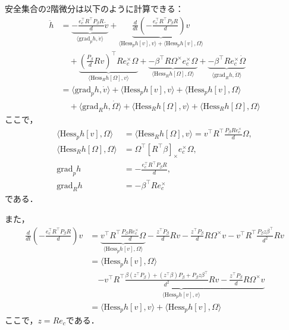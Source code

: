 安全集合の2階微分は以下のように計算できる：
\begin{equation}
\begin{aligned}
\ddot{h} &= \underbrace{-\frac{e_c^\top R^\top P_\beta R}{d} \dot{v}}_{\langle \mathrm{grad}_p h, \dot{v} \rangle} + \underbrace{\frac{d}{dt}\left(-\frac{e_c^\top R^\top P_\beta R}{d}\right) v}_{\langle \mathrm{Hess}_p h[v], v \rangle + \langle \mathrm{Hess}_p h[v], \Omega \rangle} \\
&\quad + \underbrace{\left(\frac{P_\beta}{d} R v\right)^\top R e_c^\times \Omega}_{\langle \mathrm{Hess}_R h[\Omega], v \rangle} + \underbrace{-\beta^\top R \Omega^\times e_c^\times \Omega}_{\langle \mathrm{Hess}_R h[\Omega], \Omega \rangle} + \underbrace{-\beta^\top R e_c^\times \dot{\Omega}}_{\langle \mathrm{grad}_R h, \dot{\Omega} \rangle} \\
&= \langle \mathrm{grad}_p h, \dot{v} \rangle + \langle \mathrm{Hess}_p h[v], v \rangle + \langle \mathrm{Hess}_p h[v], \Omega \rangle \\
&\quad + \langle \mathrm{grad}_R h, \dot{\Omega} \rangle + \langle \mathrm{Hess}_R h[\Omega], v \rangle + \langle \mathrm{Hess}_R h[\Omega], \Omega \rangle
\label{eq:single_hocbf_derivative}
\end{aligned}
\end{equation}
ここで，
\begin{equation}
\begin{aligned}
\langle \mathrm{Hess}_p h[v], \Omega \rangle &= \langle \mathrm{Hess}_R h[\Omega], v \rangle = v^\top R^\top \frac{P_\beta R e_c^\times}{d} \Omega, \\
\langle \mathrm{Hess}_R h[\Omega], \Omega \rangle &= \Omega^\top [R^\top \beta]_\times e_c^\times \Omega, \\
\mathrm{grad}_p h &= -\frac{e_c^\top R^\top P_\beta R}{d}, \\
\mathrm{grad}_R h &= -\beta^\top R e_c^\times
\label{eq:hessian_gradient}
\end{aligned}
\end{equation}
である．

また，
\begin{equation}
\begin{aligned}
\frac{d}{dt}\left(-\frac{e_c^\top R^\top P_\beta R}{d}\right) v &= \underbrace{v^\top R^\top \frac{P_\beta R e_c^\times}{d} \Omega}_{\langle \mathrm{Hess}_p h[v], \Omega \rangle} - \frac{z^\top \dot{P}_\beta}{d} R v - \frac{z^\top P_\beta}{d} R \Omega^\times v - v^\top R^\top \frac{P_\beta z \beta^\top}{d^2} R v \\
&= \langle \mathrm{Hess}_p h[v], \Omega \rangle \\
&\quad \underbrace{- v^\top R^\top \frac{\beta (z^\top P_\beta) + (z^\top \beta) P_\beta + P_\beta z \beta^\top}{d^2} R v - \frac{z^\top P_\beta}{d} R \Omega^\times v}_{\langle \mathrm{Hess}_p h[v], v \rangle} \\
&= \langle \mathrm{Hess}_p h[v], v \rangle + \langle \mathrm{Hess}_p h[v], \Omega \rangle
\label{eq:hessian_p_derivative}
\end{aligned}
\end{equation}
ここで，$z = R e_c$である．

